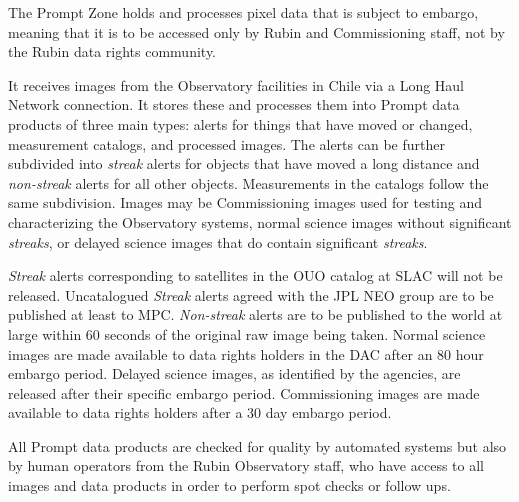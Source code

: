 The Prompt Zone holds and processes pixel data that is subject to embargo, meaning that it is to be accessed only by Rubin and \gls{Commissioning} staff, not by the Rubin data rights community.

It receives images from the Observatory facilities in Chile via a Long Haul Network connection.
It stores these and processes them into Prompt data products of three main types:
alerts for things that have moved or changed, measurement catalogs, and processed images.
The alerts can be further subdivided into \emph{streak} alerts for objects that have moved a long distance and \emph{non-streak} alerts for all other objects.
Measurements in the catalogs follow the same subdivision. Images may be \gls{Commissioning} images used for testing and characterizing the Observatory systems, normal science images without significant \emph{streaks}, or delayed science images that do contain significant \emph{streaks}.

\emph{Streak} alerts corresponding to satellites in the \gls{OUO} catalog at \gls{SLAC} will not be released.
Uncatalogued \emph{Streak} alerts agreed with the \gls{JPL} \gls{NEO} group  are to be published at least to \gls{MPC}.
\emph{Non-streak} alerts are to be published to the world at large within 60 seconds of the original raw image being taken.
Normal science images are made available to data rights holders in the \gls{DAC} after an 80 hour embargo period.
Delayed science images, as identified by the agencies, are released after their specific embargo period. \gls{Commissioning} images are made available to data rights holders after a 30 day embargo period.

All Prompt data products are checked for quality by automated systems but also by human operators from the Rubin Observatory staff, who have access to all images and data products in order to perform spot checks or follow ups.

